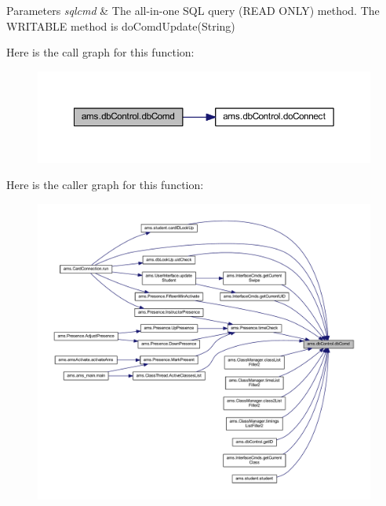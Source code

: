 \begin{DoxyParams}{Parameters}
{\em sqlcmd} & The all-\/in-\/one S\+QL query (R\+E\+AD O\+N\+LY) method. The W\+R\+I\+T\+A\+B\+LE method is do\+Comd\+Update(\+String) \\
\hline
\end{DoxyParams}
Here is the call graph for this function\+:\nopagebreak
\begin{figure}[H]
\begin{center}
\leavevmode
\includegraphics[width=350pt]{classams_1_1db_control_ade10190f5f5a56dfddcfbba1de5de38c_cgraph}
\end{center}
\end{figure}
Here is the caller graph for this function\+:\nopagebreak
\begin{figure}[H]
\begin{center}
\leavevmode
\includegraphics[width=350pt]{classams_1_1db_control_ade10190f5f5a56dfddcfbba1de5de38c_icgraph}
\end{center}
\end{figure}
\mbox{\label{classams_1_1db_control_a725cd6ae84ef6aca9bfd782b319d9f34}} 
